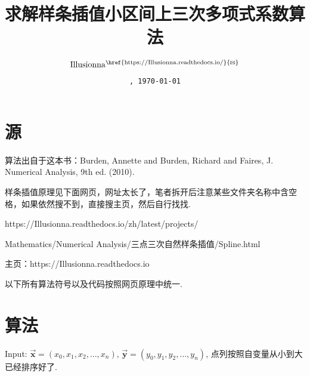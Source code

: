 \documentclass[oneside,UTF8]{article}
\title{求解样条插值小区间上三次多项式系数算法}
\author{$\rm Illusionna^{\href{https://Illusionna.readthedocs.io/}{\textrm{\Letter}}}$}
\date{\tt\small\xxivtime,\ \today}
\numberwithin{figure}{section}
\numberwithin{table}{section}
\numberwithin{equation}{section}
\newcommand*{\purple}{\color{red!200!green!20!blue!20}}
\newcommand*{\shallowRed}{\color[rgb]{1 0.2 0.5}}
\begin{document}
\maketitle

\vspace*{-15em}


\setcounter{page}{1}
\fancyhead[L]{\purple\rightmark}
\fancyhead[R]{}
\fancyhead[C]{}
\fancyfoot[C]{\normalsize--\ \thepage\ --}
\thispagestyle{fancy}

\vspace*{12em}

\begin{spacing}{1.5}
    \tableofcontents
\end{spacing}    
\pagestyle{fancy}
\section{\songti 源}

算法出自于这本书：Burden, Annette and Burden, Richard and Faires, J. Numerical Analysis, 9th ed. (2010).

样条插值原理见下面网页，网址太长了，笔者拆开后注意某些文件夹名称中含空格，如果依然搜不到，直接搜主页，然后自行找找.

https://Illusionna.readthedocs.io/zh/latest/projects/

Mathematics/Numerical Analysis/三点三次自然样条插值/Spline.html

主页：https://Illusionna.readthedocs.io

以下所有算法符号以及代码按照网页原理中统一.



\section{\songti 算法}

Input: $\bm{\vec{x}}=(x_0,x_1,x_2,\ldots,x_n)$, $\bm{\vec{y}}=(y_0,y_1,y_2,\ldots,y_n)$, 点列按照自变量从小到大已经排序好了.
\end{document}
